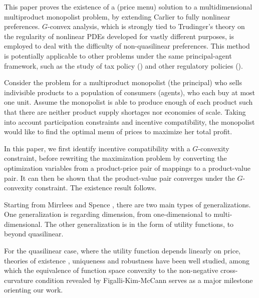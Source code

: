 \documentclass[a4paper, 11pt]{amsart}
\numberwithin{equation}{section}
\theoremstyle{plain}
\theoremstyle{definition}
\theoremstyle{remark}
\begin{document}
	This paper proves the existence of a (price menu) solution to a multidimensional multiproduct monopolist problem, {by extending} %
	Carlier \cite{Carlier01} to fully nonlinear preferences. $G$-convex analysis,  which is strongly tied to Trudinger's theory on the regularity of nonlinear PDEs \cite{Trudinger14}  developed for vastly different purposes, is employed to deal with the difficulty of non-quasilinear preferences. This method is potentially applicable to other problems under the same principal-agent framework, such as the study of tax policy (\cite{Mirrlees71}) and other regulatory policies (\cite{BaronMyerson82}). \medskip

	


Consider the problem for a multiproduct monopolist (the principal) who sells indivisible products to a population of consumers (agents), who each buy at most one unit. %
Assume the monopolist is able to produce enough of each product such that there are neither product supply shortages {nor economies of scale}. Taking into account participation constraints and incentive compatibility, the monopolist would like to find the optimal menu of prices to maximize her total profit.\medskip

	In this paper, we first identify incentive compatibility with a $G$-convexity constraint, before rewriting the maximization problem by converting the optimization variables from a product-price pair of mappings to a product-value pair. It can then be shown that the product-value pair converges under the $G$-convexity constraint. The existence result follows. \medskip






	
Starting from Mirrlees \cite{Mirrlees71} and Spence \cite{Spence74}, there are two main types of generalizations. One generalization is regarding dimension, from one-dimensional to multi-dimensional. The other generalization is in the form of utility functions, to beyond quasilinear.\medskip



For the quasilinear case, where the utility function depends linearly on price, theories of existence \cite{Basov05,RochetStole03,Carlier01,MonteiroPage98}, uniqueness \cite{CarlierLachand-Robert01,FigalliKimMcCann11,MussaRosen78,RochetChone98} and robustness \cite{Basov05,FigalliKimMcCann11} have been well studied, among which the equivalence of function space convexity to the non-negative cross-curvature condition revealed by Figalli-Kim-McCann \cite{FigalliKimMcCann11} serves as a major milestone {orienting our work}. \medskip
\end{document}
